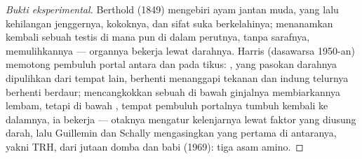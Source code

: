 \begin{proof}[Bukti eksperimental]
Berthold (1849) mengebiri ayam jantan muda, yang lalu kehilangan jenggernya, kokoknya, dan
sifat suka berkelahinya; menanamkan kembali sebuah testis di mana pun di dalam perutnya, tanpa
sarafnya, memulihkannya --- organnya bekerja lewat darahnya. Harris
(dasawarsa 1950-an) memotong pembuluh portal antara  dan  pada
tikus: , yang pasokan darahnya dipulihkan dari tempat lain, berhenti
menanggapi tekanan dan indung telurnya berhenti berdaur; mencangkokkan sebuah
 di bawah ginjalnya membiarkannya lembam, tetapi di bawah ,
tempat pembuluh portalnya tumbuh kembali ke dalamnya, ia bekerja --- otaknya mengatur
kelenjarnya lewat faktor yang diusung darah, lalu Guillemin dan Schally mengasingkan
yang pertama di antaranya, yakni TRH, dari jutaan  domba dan babi
(1969): tiga asam amino.
\end{proof}

